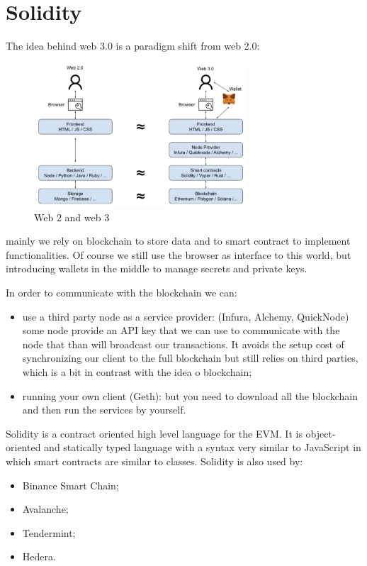 \section{Solidity}
The idea behind web 3.0 is a paradigm shift from web 2.0:
\begin{figure}
    \centering
    \includegraphics[width=300px]{images/7_Ethereum/01.png}
    \caption{Web 2 and web 3}
\end{figure}
mainly we rely on blockchain to store data and to smart contract to implement functionalities.
Of course we still use the browser as interface to this world, but introducing wallets in the middle to manage secrets and private keys.

In order to communicate with the blockchain we can:
\begin{itemize}
    \item use a third party node as a service provider: (Infura, Alchemy, QuickNode) some node provide an API key that we can use to communicate with the node that than will broadcast our transactions.
    It avoids the setup cost of synchronizing our client to the full blockchain but still relies on third parties, which is a bit in contrast with the idea o blockchain;

    \item running your own client (Geth): but you need to download all the blockchain and then run the services by yourself.
\end{itemize}

Solidity is a contract oriented high level language for the EVM.
It is object-oriented and statically typed language with a syntax very similar to JavaScript in which smart contracts are similar to classes.
Solidity is also used by:
\begin{itemize}
    \item Binance Smart Chain;
    \item Avalanche;
    \item Tendermint;
    \item Hedera.
\end{itemize}

